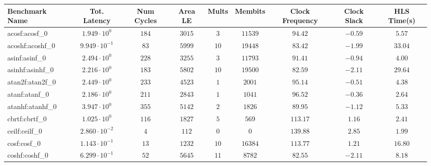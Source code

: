 \begin{tabular}{|l|c|c|c|c|c|c|c|c|}
\hline
Benchmark Name               & Tot. Latency            & Num Cycles & Area LE   & Mults   & Membits    & Clock Frequency & Clock Slack & HLS Time(s) \\
\hline
acosf:acosf\_0               & $ 1.949 \cdot 10^{0}  $ & $ 184    $ & $ 3015  $ & $ 3   $ & $ 11539  $ & $ 94.42       $ & $ -0.59   $ & $ 5.57    $ \\
acoshf:acoshf\_0             & $ 9.949 \cdot 10^{-1} $ & $ 83     $ & $ 5999  $ & $ 10  $ & $ 19448  $ & $ 83.42       $ & $ -1.99   $ & $ 33.04   $ \\
asinf:asinf\_0               & $ 2.494 \cdot 10^{0}  $ & $ 228    $ & $ 3255  $ & $ 3   $ & $ 11793  $ & $ 91.41       $ & $ -0.94   $ & $ 4.00    $ \\
asinhf:asinhf\_0             & $ 2.216 \cdot 10^{0}  $ & $ 183    $ & $ 5802  $ & $ 10  $ & $ 19500  $ & $ 82.59       $ & $ -2.11   $ & $ 29.64   $ \\
atan2f:atan2f\_0             & $ 2.449 \cdot 10^{0}  $ & $ 233    $ & $ 4523  $ & $ 1   $ & $ 2001   $ & $ 95.14       $ & $ -0.51   $ & $ 4.38    $ \\
atanf:atanf\_0               & $ 2.186 \cdot 10^{0}  $ & $ 211    $ & $ 2843  $ & $ 1   $ & $ 1041   $ & $ 96.52       $ & $ -0.36   $ & $ 2.64    $ \\
atanhf:atanhf\_0             & $ 3.947 \cdot 10^{0}  $ & $ 355    $ & $ 5142  $ & $ 2   $ & $ 1826   $ & $ 89.95       $ & $ -1.12   $ & $ 5.33    $ \\
cbrtf:cbrtf\_0               & $ 1.025 \cdot 10^{0}  $ & $ 116    $ & $ 1827  $ & $ 5   $ & $ 569    $ & $ 113.17      $ & $ 1.16    $ & $ 2.41    $ \\
ceilf:ceilf\_0               & $ 2.860 \cdot 10^{-2} $ & $ 4      $ & $ 112   $ & $ 0   $ & $ 0      $ & $ 139.88      $ & $ 2.85    $ & $ 1.99    $ \\
cosf:cosf\_0                 & $ 1.143 \cdot 10^{-1} $ & $ 13     $ & $ 1232  $ & $ 10  $ & $ 16384  $ & $ 113.77      $ & $ 1.21    $ & $ 16.80   $ \\
coshf:coshf\_0               & $ 6.299 \cdot 10^{-1} $ & $ 52     $ & $ 5645  $ & $ 11  $ & $ 8782   $ & $ 82.55       $ & $ -2.11   $ & $ 8.18    $ \\

\end{tabular}
